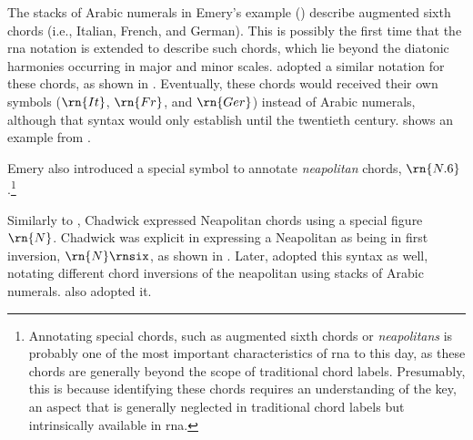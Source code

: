 


The stacks of Arabic numerals in Emery's example
() describe
augmented sixth chords (i.e., Italian, French, and German).
This is possibly the first time that the \gls{rna} notation
is extended to describe such chords, which lie beyond the
diatonic harmonies occurring in major and minor scales.
\textcite{shepard1896harmony} adopted a similar notation for
these chords, as shown in
. Eventually,
these chords would received their own symbols ($\rn{It}$,
$\rn{Fr}$, and $\rn{Ger}$) instead of Arabic numerals,
although that syntax would only establish until the
twentieth century.
 shows an
example from \textcite{goldman1965harmony}.



Emery also introduced a special symbol to annotate
\emph{neapolitan} chords, $\rn{N.6}$.\footnote{Annotating
special chords, such as augmented sixth chords or
\emph{neapolitans} is probably one of the most important
characteristics of \gls{rna} to this day, as these chords
are generally beyond the scope of traditional chord labels.
Presumably, this is because identifying these chords
requires an understanding of the key, an aspect that is
generally neglected in traditional chord labels but
intrinsically available in \gls{rna}.}

Similarly to \textcite{emery1879elements}, Chadwick
expressed Neapolitan chords using a special figure $\rn{N}$.
Chadwick was explicit in expressing a Neapolitan as being in
first inversion, $\rn{N}\rnsix$, as shown in
. Later,
\textcite{heacox1907lessons} adopted this syntax as well,
notating different chord inversions of the neapolitan using
stacks of Arabic numerals. \textcite{alchin1921applied} also
adopted it.


